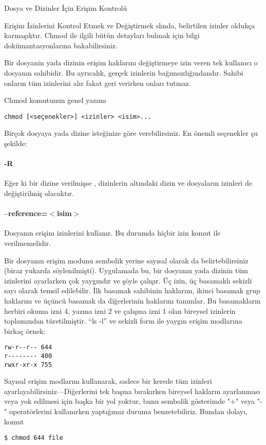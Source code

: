 \begin{section}{Dosya ve Dizinler İçin Erişim Kontrolü}
\begin{subsection}{Erişim İzinlerini Kontrol Etmek ve Değiştirmek}
slında, belirtilen izinler oldukça karmaşıktır. Chmod ile ilgili bütün detayları bulmak için bilgi dokümantasyonlarına bakabilirsiniz.

Bir dosyanin yada dizinin erişim haklarını değiştirmeye izin veren tek kullanıcı o dosyanın sahibidir. Bu ayrıcalık, gerçek izinlerin bağımsızlığındandır. Sahibi onların tüm izinlerini alır fakat geri verirken onları tutmaz.

Chmod komutunun genel yazımı
\begin{verbatim}
chmod [<seçenekler>] <izinler> <isim>...
\end{verbatim}

Birçok dosyaya yada dizine isteğinize göre verebilirsiniz. En önemli seçenekler şu şekilde:
\paragraph{-R}{Eğer ki bir dizine verilmişse , dizinlerin altındaki dizin ve dosyaların izinleri de değiştirilmiş olacaktır.}
\paragraph{--reference=$<$isim$>$}{Dosyanın erişim izinlerini kullanır. Bu durumda hiçbir izin komut ile verilmemelidir.}

Bir dosyanın erişim modunu sembolik yerine sayısal olarak da belirtebilirsiniz (biraz yukarda söylenilmişti). Uygulamada bu, bir dosyanın yada dizinin tüm izinlerini ayarlarken çok yaygındır ve şöyle çalışır. Üç izin, üç basamaklı sekizli sayı olarak temsil edilebilir. İlk basamak sahibinin haklarını, ikinci basamak grup haklarını ve üçüncü basamak da diğerlerinin haklarını tanımlar. Bu basamakların herbiri okuma izni 4, yazma izni 2 ve çalışma izni 1 olan bireysel izinlerin toplamından türetilmiştir. “ls -l” ve sekizli form ile yaygın erişim modlarına birkaç örnek:
\begin{verbatim}
rw-r--r-- 644
r-------- 400
rwxr-xr-x 755
\end{verbatim}

Sayısal erişim modlarını kullanarak, sadece bir kerede tüm izinleri ayarlayabilirsiniz—Diğerlerini tek başına bırakırken bireysel hakların ayarlanması veya yok edilmesi için başka bir yol yoktur, bunu sembolik gösterimde "+" veya "-" operatörlerini kullanırken yaptığımız duruma benzetebiliriz. Bundan dolayı, komut
\begin{verbatim}
$ chmod 644 file
\end{verbatim}


\end{subsection}
\end{section}

